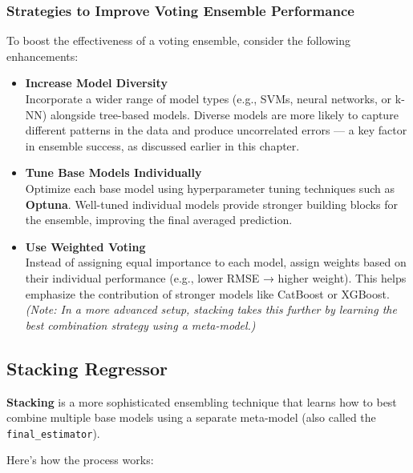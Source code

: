 \documentclass[
  letterpaper,
  DIV=11,
  numbers=noendperiod]{scrreprt}
\begin{document}
\subsubsection{Strategies to Improve Voting Ensemble
Performance}\label{strategies-to-improve-voting-ensemble-performance}

To boost the effectiveness of a voting ensemble, consider the following
enhancements:

\begin{itemize}
\item
  \textbf{Increase Model Diversity}\\
  Incorporate a wider range of model types (e.g., SVMs, neural networks,
  or k-NN) alongside tree-based models. Diverse models are more likely
  to capture different patterns in the data and produce uncorrelated
  errors --- a key factor in ensemble success, as discussed earlier in
  this chapter.
\item
  \textbf{Tune Base Models Individually}\\
  Optimize each base model using hyperparameter tuning techniques such
  as \textbf{Optuna}. Well-tuned individual models provide stronger
  building blocks for the ensemble, improving the final averaged
  prediction.
\item
  \textbf{Use Weighted Voting}\\
  Instead of assigning equal importance to each model, assign weights
  based on their individual performance (e.g., lower RMSE → higher
  weight). This helps emphasize the contribution of stronger models like
  CatBoost or XGBoost.\\
  \emph{(Note: In a more advanced setup, stacking takes this further by
  learning the best combination strategy using a meta-model.)}
\end{itemize}

\subsection{Stacking Regressor}\label{stacking-regressor}

\textbf{Stacking} is a more sophisticated ensembling technique that
learns how to best combine multiple base models using a separate
meta-model (also called the \texttt{final\_estimator}).

Here's how the process works:
\end{document}
